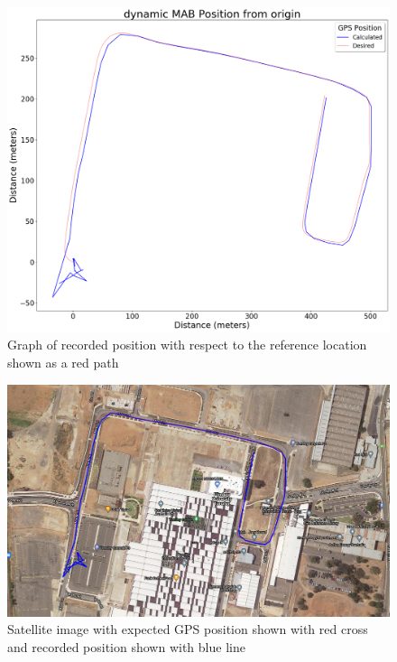 \begin{figure}[H]
    \begin{centering}
        \includegraphics[width=12cm,keepaspectratio]{Figures/2021_3_30_dynamic_MAB Position from origin.png}
        \caption{Graph of recorded position with respect to the reference location shown as a red path}
        \label{fig:MABdynamicPosition}
    \end{centering}
\end{figure}

\begin{figure}[H]
    \begin{centering}
        \includegraphics[width=14cm,keepaspectratio]{Figures/2021_3_30_dynamic_MAB_Satellite.PNG}
        \caption{Satellite image with expected GPS position shown with red cross and recorded position shown with blue line}
        \label{fig:MABdynamicSatelliteImage}
    \end{centering}
\end{figure}

